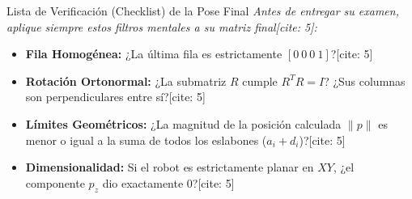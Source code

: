 \documentclass[aspectratio=169, table, xcdraw]{beamer}
\begin{document}
\begin{frame}{Lista de Verificación (Checklist) de la Pose Final}
    \textit{Antes de entregar su examen, aplique siempre estos filtros mentales a su matriz final[cite: 5]:}
    
    \vspace{0.4cm}
    \begin{itemize}
        \item[\checkmark] \textbf{Fila Homogénea:} ¿La última fila es estrictamente $[0 \ 0 \ 0 \ 1]$?[cite: 5]
        \item[\checkmark] \textbf{Rotación Ortonormal:} ¿La submatriz $R$ cumple $R^TR = I$? ¿Sus columnas son perpendiculares entre sí?[cite: 5]
        \item[\checkmark] \textbf{Límites Geométricos:} ¿La magnitud de la posición calculada $\|p\|$ es menor o igual a la suma de todos los eslabones ($a_i + d_i$)?[cite: 5]
        \item[\checkmark] \textbf{Dimensionalidad:} Si el robot es estrictamente planar en $XY$, ¿el componente $p_z$ dio exactamente $0$?[cite: 5]
    \end{itemize}
\end{frame}
\end{document}
